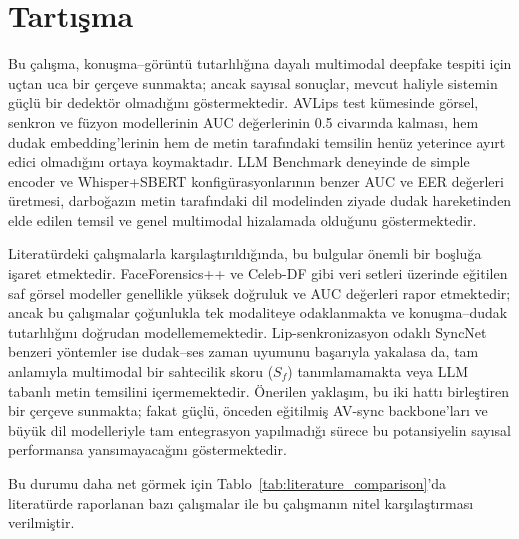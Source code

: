 \documentclass[conference]{IEEEtran}
\begin{document}
\section{Tartışma}

Bu çalışma, konuşma--görüntü tutarlılığına dayalı multimodal deepfake tespiti için uçtan uca bir çerçeve sunmakta; ancak sayısal sonuçlar, mevcut haliyle sistemin güçlü bir dedektör olmadığını göstermektedir. AVLips test kümesinde görsel, senkron ve füzyon modellerinin AUC değerlerinin 0.5 civarında kalması, hem dudak embedding'lerinin hem de metin tarafındaki temsilin henüz yeterince ayırt edici olmadığını ortaya koymaktadır. LLM Benchmark deneyinde de simple encoder ve Whisper+SBERT konfigürasyonlarının benzer AUC ve EER değerleri üretmesi, darboğazın metin tarafındaki dil modelinden ziyade dudak hareketinden elde edilen temsil ve genel multimodal hizalamada olduğunu göstermektedir.

Literatürdeki çalışmalarla karşılaştırıldığında, bu bulgular önemli bir boşluğa işaret etmektedir. FaceForensics++ ve Celeb-DF gibi veri setleri üzerinde eğitilen saf görsel modeller genellikle yüksek doğruluk ve AUC değerleri rapor etmektedir; ancak bu çalışmalar çoğunlukla tek modaliteye odaklanmakta ve konuşma--dudak tutarlılığını doğrudan modellememektedir. Lip-senkronizasyon odaklı SyncNet benzeri yöntemler ise dudak--ses zaman uyumunu başarıyla yakalasa da, tam anlamıyla multimodal bir sahtecilik skoru ($S_f$) tanımlamamakta veya LLM tabanlı metin temsilini içermemektedir. Önerilen yaklaşım, bu iki hattı birleştiren bir çerçeve sunmakta; fakat güçlü, önceden eğitilmiş AV-sync backbone'ları ve büyük dil modelleriyle tam entegrasyon yapılmadığı sürece bu potansiyelin sayısal performansa yansımayacağını göstermektedir.

Bu durumu daha net görmek için Tablo~\ref{tab:literature_comparison}'da literatürde raporlanan bazı çalışmalar ile bu çalışmanın nitel karşılaştırması verilmiştir.
\end{document}
